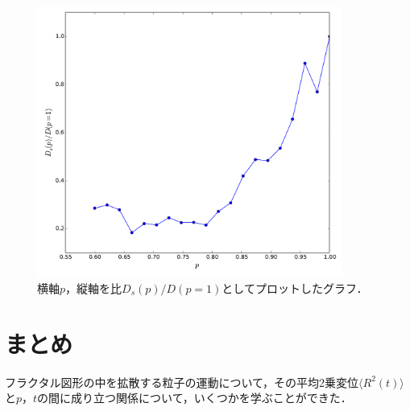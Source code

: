 \documentclass{jsarticle}
\begin{document}
\begin{enumerate}
\begin{enumerate}
                \begin{figure}[H]
                    \begin{center}
                        \includegraphics[width=10.0cm]{figure_7.pdf}
                        \caption{横軸$p$，縦軸を比$D_{s}(p)/D(p=1)$としてプロットしたグラフ．}
                        \label{fig:14-8-f6}
                    \end{center}
                \end{figure}

            \end{enumerate} 
        
    \end{enumerate}

\section{まとめ}
    フラクタル図形の中を拡散する粒子の運動について，その平均2乗変位$\langle R^{2}(t) \rangle$と$p$，$t$の間に成り立つ関係について，いくつかを学ぶことができた．
\nocite{textbook}

\end{document}
